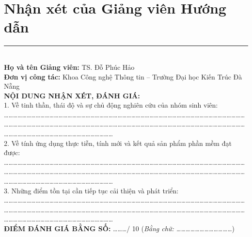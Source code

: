 \documentclass[12pt, a4paper]{article}
\begin{document}
\section*{Nhận xét của Giảng viên Hướng dẫn}
\noindent\rule{\textwidth}{0.4pt}\\[0.3cm]
\textbf{Họ và tên Giảng viên:} TS. Đỗ Phúc Hảo\\
\textbf{Đơn vị công tác:} Khoa Công nghệ Thông tin -- Trường Đại học Kiến Trúc Đà Nẵng\\[0.4cm]
\textbf{NỘI DUNG NHẬN XÉT, ĐÁNH GIÁ:}\\[0.2cm]
1. Về tinh thần, thái độ và sự chủ động nghiên cứu của nhóm sinh viên:\\[0.15cm]
\dots\dots\dots\dots\dots\dots\dots\dots\dots\dots\dots\dots\dots\dots\dots\dots\dots\dots\dots\dots\dots\dots\dots\dots\dots\dots\dots\dots\dots\dots\dots\dots\dots\dots\dots\dots\dots\dots\dots\dots\dots\dots\dots\dots\dots\dots\dots\dots\dots\dots\dots\dots\dots\dots\dots\dots\dots\dots\dots\dots\dots\dots\dots\dots\dots\dots\dots\dots\dots\dots\dots\dots\dots\dots\dots\dots\dots\dots\dots\dots\dots\dots\dots\dots\dots\dots\dots\dots\dots\dots\dots\dots\dots\dots\dots\dots\dots\dots\dots\dots\dots\dots\dots\dots\dots\dots\dots\dots\dots\dots\dots\dots\dots\dots\dots\dots\dots\dots\dots\dots\dots\dots\dots\dots\dots\dots\dots\dots\dots\dots\\[0.25cm]
2. Về tính ứng dụng thực tiễn, tính mới và kết quả sản phẩm phần mềm đạt được:\\[0.15cm]
\dots\dots\dots\dots\dots\dots\dots\dots\dots\dots\dots\dots\dots\dots\dots\dots\dots\dots\dots\dots\dots\dots\dots\dots\dots\dots\dots\dots\dots\dots\dots\dots\dots\dots\dots\dots\dots\dots\dots\dots\dots\dots\dots\dots\dots\dots\dots\dots\dots\dots\dots\dots\dots\dots\dots\dots\dots\dots\dots\dots\dots\dots\dots\dots\dots\dots\dots\dots\dots\dots\dots\dots\dots\dots\dots\dots\dots\dots\dots\dots\dots\dots\dots\dots\dots\dots\dots\dots\dots\dots\dots\dots\dots\dots\dots\dots\dots\dots\dots\dots\dots\dots\dots\dots\dots\dots\dots\dots\dots\dots\dots\dots\dots\dots\dots\dots\dots\dots\dots\dots\dots\dots\dots\dots\dots\dots\dots\dots\dots\dots\\[0.25cm]
3. Những điểm tồn tại cần tiếp tục cải thiện và phát triển:\\[0.15cm]
\dots\dots\dots\dots\dots\dots\dots\dots\dots\dots\dots\dots\dots\dots\dots\dots\dots\dots\dots\dots\dots\dots\dots\dots\dots\dots\dots\dots\dots\dots\dots\dots\dots\dots\dots\dots\dots\dots\dots\dots\dots\dots\dots\dots\dots\dots\dots\dots\dots\dots\dots\dots\dots\dots\dots\dots\dots\dots\dots\dots\dots\dots\dots\dots\dots\dots\dots\dots\dots\dots\dots\dots\dots\dots\dots\dots\dots\dots\dots\dots\dots\dots\dots\dots\dots\dots\dots\dots\dots\dots\dots\dots\dots\dots\dots\dots\dots\dots\dots\dots\dots\dots\dots\dots\dots\dots\dots\dots\dots\dots\dots\dots\dots\dots\dots\dots\dots\dots\dots\dots\dots\dots\dots\dots\dots\dots\dots\dots\dots\dots\\[0.4cm]
\textbf{ĐIỂM ĐÁNH GIÁ BẰNG SỐ:} \dots\dots\dots / 10 \quad (\textit{Bằng chữ: \dots\dots\dots\dots\dots\dots\dots\dots\dots\dots\dots\dots})
\end{document}

